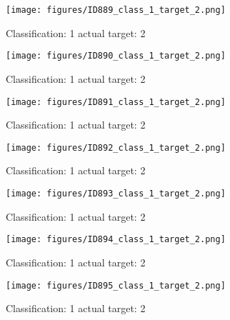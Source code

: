 \begin{figure}[h!]
\begin{center}
\texttt{[image: figures/ID889\_class\_1\_target\_2.png]}
\end{center}
\caption{ Classification: 1 actual target: 2}
\label{fig:ID889_class_1_target_2}
\end{figure}
\begin{figure}[h!]
\begin{center}
\texttt{[image: figures/ID890\_class\_1\_target\_2.png]}
\end{center}
\caption{ Classification: 1 actual target: 2}
\label{fig:ID890_class_1_target_2}
\end{figure}
\begin{figure}[h!]
\begin{center}
\texttt{[image: figures/ID891\_class\_1\_target\_2.png]}
\end{center}
\caption{ Classification: 1 actual target: 2}
\label{fig:ID891_class_1_target_2}
\end{figure}
\begin{figure}[h!]
\begin{center}
\texttt{[image: figures/ID892\_class\_1\_target\_2.png]}
\end{center}
\caption{ Classification: 1 actual target: 2}
\label{fig:ID892_class_1_target_2}
\end{figure}
\begin{figure}[h!]
\begin{center}
\texttt{[image: figures/ID893\_class\_1\_target\_2.png]}
\end{center}
\caption{ Classification: 1 actual target: 2}
\label{fig:ID893_class_1_target_2}
\end{figure}
\begin{figure}[h!]
\begin{center}
\texttt{[image: figures/ID894\_class\_1\_target\_2.png]}
\end{center}
\caption{ Classification: 1 actual target: 2}
\label{fig:ID894_class_1_target_2}
\end{figure}
\begin{figure}[h!]
\begin{center}
\texttt{[image: figures/ID895\_class\_1\_target\_2.png]}
\end{center}
\caption{ Classification: 1 actual target: 2}
\label{fig:ID895_class_1_target_2}
\end{figure}

